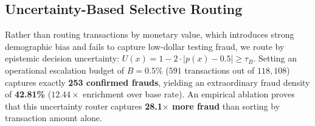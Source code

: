 \documentclass[10pt,a4paper]{article}
\begin{document}
\clearpage


\subsection{Uncertainty-Based Selective Routing}
Rather than routing transactions by monetary value, which introduces strong demographic bias and fails to capture low-dollar testing fraud, we route by epistemic decision uncertainty: $U(x) = 1 - 2 \cdot |p(x) - 0.5| \ge \tau_B$. Setting an operational escalation budget of $B = 0.5\%$ ($591$ transactions out of $118,108$) captures exactly \textbf{253 confirmed frauds}, yielding an extraordinary fraud density of \textbf{42.81\%} ($12.44\times$ enrichment over base rate). An empirical ablation proves that this uncertainty router captures \textbf{28.1$\times$ more fraud} than sorting by transaction amount alone.
\end{document}
